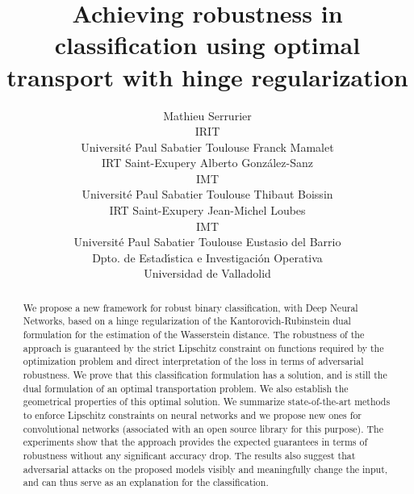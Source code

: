 \documentclass{article}
\begin{document}
\title{Achieving robustness in classification using optimal transport with hinge regularization}
\author{
  Mathieu Serrurier \\
  IRIT\\
  Universit\'{e} Paul Sabatier Toulouse
  \And
  Franck Mamalet\\
  IRT Saint-Exupery
 \And
  Alberto Gonz\'{a}lez-Sanz\\
  IMT\\
  Universit\'{e} Paul Sabatier Toulouse
  \And
  Thibaut Boissin\\
  IRT Saint-Exupery
 \And
  Jean-Michel Loubes \\
  IMT\\
  Universit\'{e} Paul Sabatier Toulouse
 \And
  Eustasio del Barrio \\
  Dpto. de Estad\'{\i}stica e Investigaci\'{o}n Operativa\\
  Universidad de Valladolid  
}
\maketitle
\begin{abstract}
We propose a new framework for robust binary classification, with Deep Neural Networks,  based on a hinge regularization of the Kantorovich-Rubinstein dual formulation for the estimation of the Wasserstein distance. The robustness of the approach is guaranteed by the strict Lipschitz constraint on functions required by the optimization problem and direct interpretation of the loss in terms of adversarial robustness. We prove that this classification formulation has a solution, and is still the dual formulation of an optimal transportation problem.  We also establish the geometrical properties of this optimal solution. We summarize  state-of-the-art methods to enforce Lipschitz constraints on neural networks and we propose new ones for convolutional networks (associated with an open source library for this purpose). The experiments show that the approach provides the expected guarantees in terms of robustness without any significant accuracy drop. The results also suggest that adversarial attacks on the proposed models visibly and meaningfully change the input, and can thus serve as an explanation for the classification.
\end{abstract}
\end{document}
